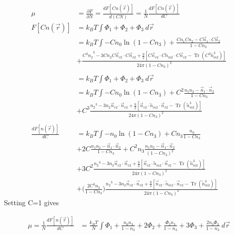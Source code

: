 \documentclass[double,12pt]{revtex4-2}
\begin{document}
\begin{align}
  \mu &= \frac{\partial F}{\partial N} = \frac{dF[Cn(\vec r)]}{d(CN)} = \frac{1}{N}\frac{dF[Cn(\vec r)]}{dC}\\
   F[Cn(\vec r)] &= k_BT\int \Phi_1 +\Phi_2+\Phi_3 ~d\vec r \\
   &= k_BT\int -Cn_0\ln\left(1-Cn_3\right) + \frac{Cn_1Cn_2-C\vec n_1\cdot C\vec n_2}{1-Cn_3} \\
   &+ \frac{{C^3n_2}^3-3Cn_2C\vec n_{v2}\cdot C\vec n_{v2}+\frac{9}{2}
       [C\vec n_{v2}\cdot{C\overleftrightarrow{n}_{m2}}\cdot{C\vec n_{v2}}
       -\operatorname{Tr}({C^3\overleftrightarrow n^3_{m2}})]}{24\pi(1-Cn_3)^2}    \\ \\
   &= k_BT\int \Phi_1 +\Phi_2+\Phi_3 ~d\vec r \\
   &= k_BT\int -Cn_0\ln\left(1-Cn_3\right) + C^2\frac{n_1n_2-\vec n_1\cdot \vec n_2}{1-Cn_3} \\
   &+ C^3\frac{{n_2}^3-3n_2\vec n_{v2}\cdot \vec n_{v2}+\frac{9}{2}
       [\vec n_{v2}\cdot{\overleftrightarrow{n}_{m2}}\cdot{\vec n_{v2}}
       -\operatorname{Tr}({\overleftrightarrow n^3_{m2}})]}{24\pi(1-Cn_3)^2}    \\ \\
%   
  \frac{dF[n(\vec r)]}{dC}    &= k_BT\int -n_0\ln\left(1-Cn_3\right) + Cn_3\frac{n_0}{1-Cn_3} \\
   &+ 2C\frac{n_1n_2-\vec n_1\cdot\vec n_2}{1-Cn_3} +C^2n_3 \frac{n_1n_2-\vec n_1\cdot\vec n_2}{(1-Cn_3)^2} \\   
   &+ 3C^2\frac{{n_2}^3-3n_2\vec n_{v2}\cdot \vec n_{v2} 
   + \frac{9}{2}[\vec n_{v2}\cdot{\overleftrightarrow{n}_{m2}}\cdot{\vec n_{v2}} 
       -\operatorname{Tr}({\overleftrightarrow n^3_{m2}})]}{24\pi(1-Cn_3)^2}   \\ 
    &+ \Bigg(\frac{2C^3n_3}{1-Cn_3}\Bigg)\frac{{n_2}^3-3n_2\vec n_{v2}\cdot \vec n_{v2} 
    + \frac{9}{2}[\vec n_{v2}\cdot{\overleftrightarrow{n}_{m2}}\cdot{\vec n_{v2}}   
       -\operatorname{Tr}({\overleftrightarrow n^3_{m2}})]}{24\pi(1-Cn_3)^2}     
\end{align} 
Setting C=1 gives

\begin{align}
   \mu = \frac{1}{N}\frac{dF[n(\vec r)]}{dC} &= \frac{k_BT}{N}\int \Phi_1 + \frac{n_0n_3}{1-n_3} 
   + 2\Phi_2 + \frac{\Phi_2 n_3}{1-n_3} + 3\Phi_3 + \frac{2n_3\Phi_3}{1-n_3} ~d\vec r    
\end{align} 
\end{document}
